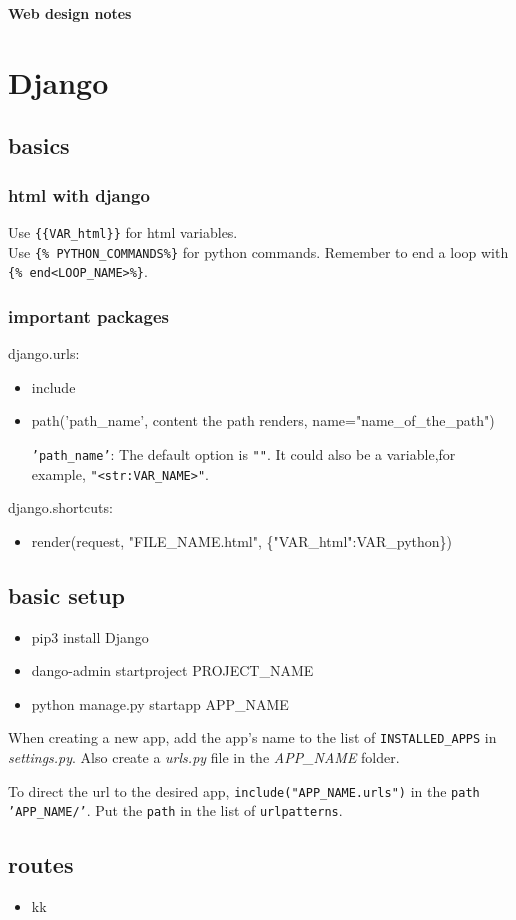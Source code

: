 \documentclass[a4paper,12 pt]{article}
\newcommand{\hN}{\_NAME}
\begin{document}
\color{Btext}
\begin{center}
	\LARGE\bfseries
	Web design notes
\end{center}
\section{Django}
\subsection{basics}
	\subsubsection{html with django}
	Use \texttt{\{\{VAR\_html\}\}} for html variables.\\
	Use \texttt{\{\% PYTHON\_COMMANDS\%\}} for python commands. Remember to end a loop with \texttt{\{\% end<LOOP\_NAME>\%\}}.
	\subsubsection{important packages}
	\ttfamily
	django.urls:
	\begin{itemize}
		\item include
		\item path('path\_name', content the path renders, name="name\_of\_the\_path")
		
		\textnormal{
		\texttt{'path\_name'}:
		The default option is \texttt{""}. It could also be a variable,for example, \texttt{"<str:VAR\_NAME>"}.
		}
	\end{itemize}
	django.shortcuts:
	\begin{itemize}
		\item render(request, "FILE\_NAME.html", \{"VAR\_html":VAR\_python\})
	\end{itemize}
	\subsection{basic setup}
	\begin{itemize}
	\ttfamily
		\item pip3 install Django
		\item dango-admin startproject PROJECT\hN
		\item python manage.py startapp APP\hN
	\end{itemize}
	\normalfont
	When creating a new app, add the app's name to the list of \texttt{INSTALLED\_APPS} in \textit{settings.py}. Also create a \textit{urls.py} file in the \textit{APP\hN} folder.
	
	To direct the url to the desired app, \texttt{include("APP\hN.urls")} in the \texttt{path 'APP\hN/'}. Put the \texttt{path} in the list of \texttt{urlpatterns}.		
	\subsection{routes}
		\begin{itemize}
		\item kk
	\end{itemize}
\end{document}
